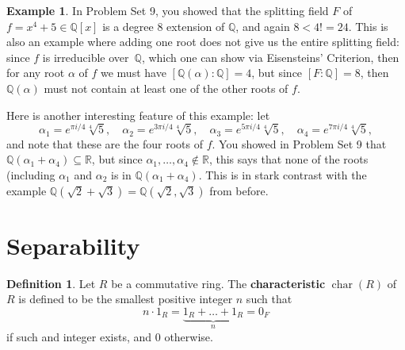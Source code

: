 \documentclass[12pt]{report}
\newtheorem{lemma}[theorem]{Lemma}
\numberwithin{equation}{section}
\numberwithin{theorem}{chapter}
\theoremstyle{definition}
\newtheorem{definition}[theorem]{Definition}
\newtheorem{example}[theorem]{Example}
\newtheorem*{basic properties}{Basic Properties}
\newtheorem*{Important Remark}{Important Remark}
\newcommand{\df}[1]{{\bf #1}\index{#1}}
\newcommand{\R}{\mathbb{R}}
\newcommand{\Q}{\mathbb{Q}}
\DeclareMathOperator{\ch}{char}
\begin{document}
%
%



\begin{example}\label{example a+b not same as a b}
	In Problem Set 9, you showed that the splitting field $F$ of $f = x^4 + 5 \in \Q[x]$ is a degree $8$ extension of $\Q$, and again $8<4!=24$. This is also an example where adding one root does not give us the entire splitting field: since $f$ is irreducible over~$\Q$, which one can show via Eisensteins' Criterion, then for any root $\alpha$ of $f$ we must have $[\Q(\alpha) : \Q] = 4$, but since $[F:\Q] = 8$, then $\Q(\alpha)$ must not contain at least one of the other roots of $f$. 
	
Here is another interesting feature of this example: let
$$\alpha_1 = e^{\pi i/4}\sqrt[4]{5}, \quad
\alpha_2 = e^{3\pi i/4}\sqrt[4]{5}, \quad
\alpha_3 = e^{5\pi i/4}\sqrt[4]{5}, \quad
\alpha_4 = e^{7\pi i/4}\sqrt[4]{5},$$
and note that these are the four roots of $f$. You showed in Problem Set 9 that $\Q(\alpha_1 + \alpha_4) \subseteq \R$, but since $\alpha_1, \ldots, \alpha_4 \notin \R$, this says that none of the roots (including $\alpha_1$ and $\alpha_2$ is in $\Q(\alpha_1 + \alpha_4)$. This is in stark contrast with the example $\Q(\sqrt{2}+\sqrt{3}) = \Q(\sqrt{2}, \sqrt{3})$ from before.
\end{example}






\section{Separability}



\begin{definition}
Let $R$ be a commutative ring. The \df{characteristic} $\ch(R)$ of $R$ is defined to be the smallest positive integer $n$ such that 
$$n\cdot 1_R= \underbrace{1_R+\ldots+1_R}_{n}=0_F$$ 
if such and integer exists, and $0$ otherwise.\index{$\ch(R)$}
\end{definition}
 
\end{document}

